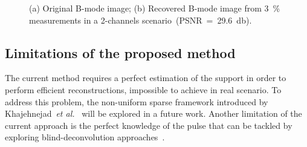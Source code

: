 \documentclass{article}
\newcommand{\etal}{\textit{et al.}}
\theoremstyle{definition}
\begin{document}
\begin{figure}[htb]
	\hfill%
	\hfill%
	\hfill%
	\caption{(a) Original B-mode image; (b) Recovered B-mode image from \SI{3}{\percent} measurements in a \num{2}-channels scenario~(PSNR~=~\SI{29.6}{\decibel}).}
	\label{fig_carotid}
\end{figure}
\subsection{Limitations of the proposed method}
\label{subsec_limitations}
The current method requires a perfect estimation of the support in order to perform efficient reconstructions, impossible to achieve in real scenario. To address this problem, the non-uniform sparse framework introduced by Khajehnejad~\etal{}~\cite{Khajehnejad_TSP_2011} will be explored in a future work. Another limitation of the current approach is the perfect knowledge of the pulse that can be tackled by exploring blind-deconvolution approaches~\cite{Hedge_TSP_2011, Demirli2001, Zhao_IUS_2016}.
\end{document}
